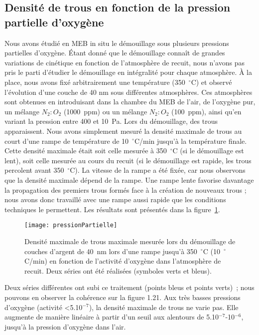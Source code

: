 {{	\subsection{Densité de trous en fonction de la pression partielle d'oxygène}
Nous avons étudié en MEB in situ le démouillage sous plusieurs pressions partielles d’oxygène. Étant donné que le démouillage connaît de grandes variations de cinétique en fonction de l’atmosphère de recuit, nous n’avons pas pris le parti d’étudier le démouillage en intégralité pour chaque atmosphère. À la place, nous avons fixé arbitrairement une température (350~$^\circ$C) et observé l’évolution d’une couche de 40 nm sous différentes atmosphères. Ces atmosphères sont obtenues en introduisant dans la chambre du MEB de l'air, de l'oxygène pur, un mélange $N_2:O_2$ (1000~ppm) ou un mélange $N_2:O_2$ (100~ppm), ainsi qu'en variant la pression entre 400 et 10~Pa. Lors du démouillage, des trous apparaissent. Nous avons simplement mesuré la densité maximale de trous au court d’une rampe de température de 10~$^\circ$C/min jusqu’à la température finale. Cette densité maximale était soit celle mesurée à 350~$^\circ$C (si le démouillage est lent), soit celle mesurée au cours du recuit (si le démouillage est rapide, les trous percolent avant 350~$^\circ$C). La vitesse de la rampe a été fixée, car nous observons que la densité maximale dépend de la rampe. Une rampe lente favorise davantage la propagation des premiers trous formés face à la création de nouveaux trous ; nous avons donc travaillé avec une rampe aussi rapide que les conditions techniques le permettent. Les résultats sont présentés dans la figure~\ref{pressionPartielle}.\par 
\begin{figure}[!htb]
\centering
\texttt{[image: pressionPartielle]}
\caption{Densité  maximale de trous maximale mesurée lors du démouillage de couches d’argent de 40~nm lors d’une rampe jusqu’à 350~$^\circ$C (10~$^\circ$C/min) en fonction de l’activité d’oxygène dans l’atmosphère de recuit. Deux séries ont été réalisées (symboles verts et bleus).}
\label{pressionPartielle}
\end{figure}
Deux séries différentes ont subi ce traitement (points bleus et points verts)~; nous pouvons en observer la cohérence sur la figure 1.21. Aux très basses pressions d’oxygène (activité <5.10$^{-7}$), la densité maximale de trous ne varie pas. Elle augmente de manière linéaire à partir d’un seuil aux alentours de 5.10$^{-7}$-10$^{-6}$, jusqu’à la pression d’oxygène dans l’air.\par 
}}
